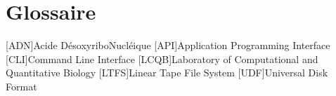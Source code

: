 
\chapter*{Glossaire}
\begin{acronym}
	[ADN]{Acide DésoxyriboNucléique}
	[API]{Application Programming Interface}
	[CLI]{Command Line Interface}
	[LCQB]{Laboratory of Computational and Quantitative Biology}
	[LTFS]{Linear Tape File System}
	[UDF]{Universal Disk Format}
\end{acronym}
